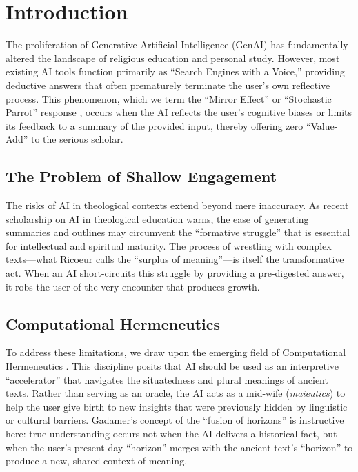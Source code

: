 \section{Introduction}
The proliferation of Generative Artificial Intelligence (GenAI) has fundamentally altered the landscape of religious education and personal study. However, most existing AI tools function primarily as ``Search Engines with a Voice,'' providing deductive answers that often prematurely terminate the user's own reflective process. This phenomenon, which we term the ``Mirror Effect'' or ``Stochastic Parrot'' response \cite{bender2021parrots}, occurs when the AI reflects the user's cognitive biases or limits its feedback to a summary of the provided input, thereby offering zero ``Value-Add'' to the serious scholar.

\subsection{The Problem of Shallow Engagement}
The risks of AI in theological contexts extend beyond mere inaccuracy. As recent scholarship on AI in theological education warns, the ease of generating summaries and outlines may circumvent the ``formative struggle'' that is essential for intellectual and spiritual maturity. The process of wrestling with complex texts---what Ricoeur \cite{ricoeur1976} calls the ``surplus of meaning''---is itself the transformative act. When an AI short-circuits this struggle by providing a pre-digested answer, it robs the user of the very encounter that produces growth.

\subsection{Computational Hermeneutics}
To address these limitations, we draw upon the emerging field of Computational Hermeneutics \cite{kommers2026}. This discipline posits that AI should be used as an interpretive ``accelerator'' that navigates the situatedness and plural meanings of ancient texts. Rather than serving as an oracle, the AI acts as a mid-wife (\textit{maieutics}) to help the user give birth to new insights that were previously hidden by linguistic or cultural barriers. Gadamer's \cite{gadamer1960} concept of the ``fusion of horizons'' is instructive here: true understanding occurs not when the AI delivers a historical fact, but when the user's present-day ``horizon'' merges with the ancient text's ``horizon'' to produce a new, shared context of meaning.

